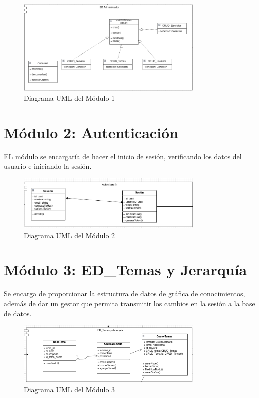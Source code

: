 \documentclass{report}
\begin{document}
\begin{figure}[H]
    \centering
    \includegraphics[width=0.8\textwidth]{./Diagramas/Modulo1.png}
    \caption{Diagrama UML del Módulo 1}
\end{figure}

\section{Módulo 2: Autenticación}
EL módulo se encargaría de hacer el inicio de sesión, verificando los datos del usuario e iniciando la sesión.

\begin{figure}[H]
    \centering
    \includegraphics[width=0.8\textwidth]{./Diagramas/Modulo2.png}
    \caption{Diagrama UML del Módulo 2}
\end{figure}

\section{Módulo 3: ED\_Temas y Jerarquía}
Se encarga de proporcionar la estructura de datos de gráfica de conocimientos, además de dar un gestor que permita transmitir los cambios en la sesión a la base de datos.

\begin{figure}[H]
    \centering
    \includegraphics[width=0.8\textwidth]{./Diagramas/Modulo3.png}
    \caption{Diagrama UML del Módulo 3}
\end{figure}
\end{document}
